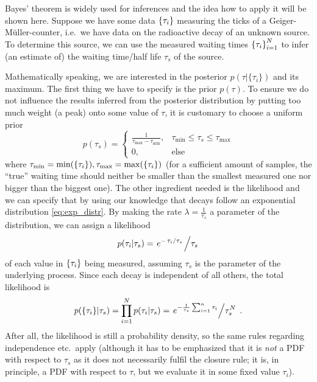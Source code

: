 \begin{ex}
Bayes' theorem is widely used for inferences and the idea how to apply it will be shown here. Suppose we have some data $\qty{\tau_i}$ measuring the ticks of a Geiger-Müller-counter, i.e.~we have data on the radioactive decay of an unknown source. To determine this source, we can use the measured waiting times $\qty{\tau_i}_{i = 1}^N$ to infer (an estimate of) the waiting time/half life $\tau_s$ of the source.

Mathematically speaking, we are interested in the posterior $p(\tau | \{\tau_i\})$ and its maximum. The first thing we have to specify is the prior $p(\tau)$. To ensure we do not influence the results inferred from the posterior distribution by putting too much weight (a peak) onto some value of $\tau$, it is customary to choose a uniform prior
\begin{equation*}
p(\tau_s) = \begin{cases} \frac{1}{\tau_\text{max} - \tau_\text{min}}, & \tau_\text{min} \leq \tau_s \leq \tau_\text{max} \\ 0, & \text{else} \end{cases}
\end{equation*}
where $\tau_\text{min} = \min(\qty{\tau_i}), \tau_\text{max} = \max(\qty{\tau_i})$ (for a sufficient amount of samples, the \enquote{true} waiting time should neither be smaller than the smallest measured one nor bigger than the biggest one). The other ingredient needed is the likelihood and we can specify that by using our knowledge that decays follow an exponential distribution \eqref{eq:exp_distr}. By making the rate $\lambda = \frac{1}{\tau_s}$ a parameter of the distribution, we can assign a likelihood
\begin{equation*}
p(\tau_i | \tau_s) = \flatfrac{e^{- \flatfrac{\tau_i}{\tau_s}}}{\tau_s}
\end{equation*}
of each value in $\qty{\tau_i}$ being measured, assuming $\tau_s$ is the parameter of the underlying process. Since each decay is independent of all others, the total likelihood is
\begin{equation*}
p(\{\tau_i\} | \tau_s) = \prod_{i = 1}^N p(\tau_i | \tau_s) = \flatfrac{e^{- \frac{1}{\tau_s} \sum_{i = 1}^n \tau_i}}{\tau_s^N} \, .
\end{equation*}
After all, the likelihood is still a probability density, so the same rules regarding independence etc.~apply (although it has to be emphasized that it is \emph{not} a PDF with respect to $\tau_s$ as it does not necessarily fulfil the closure rule; it is, in principle, a PDF with respect to $\tau$, but we evaluate it in some fixed value $\tau_i$).


\end{ex}
